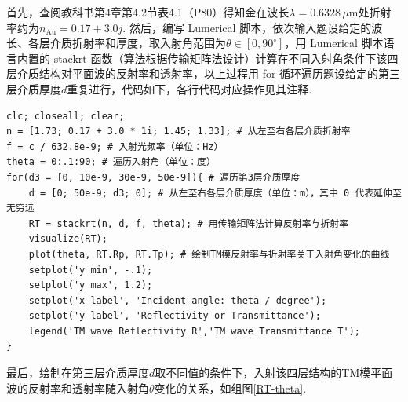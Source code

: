 \documentclass{assignment}
\begin{document}
\begin{sol}
    首先，查阅教科书第4章第4.2节表4.1（P80）\cite{chen2006foundations}得知金在波长$\lambda=0.6328\,\mu\mathrm{m}$处折射率约为$n_{\text{Au}}=0.17+3.0j$. 然后，编写 Lumerical 脚本，依次输入题设给定的波长、各层介质折射率和厚度，取入射角范围为$\theta\in[0,90^{\circ}]$，用 Lumerical 脚本语言内置的 stackrt 函数（算法根据传输矩阵法设计）计算在不同入射角条件下该四层介质结构对平面波的反射率和透射率，以上过程用 for 循环遍历题设给定的第三层介质厚度$d$重复进行，代码如下，各行代码对应操作见其注释.
    \begin{lstlisting}
clc; closeall; clear;
n = [1.73; 0.17 + 3.0 * 1i; 1.45; 1.33]; # 从左至右各层介质折射率
f = c / 632.8e-9; # 入射光频率（单位：Hz）
theta = 0:.1:90; # 遍历入射角（单位：度）
for(d3 = [0, 10e-9, 30e-9, 50e-9]){ # 遍历第3层介质厚度
    d = [0; 50e-9; d3; 0]; # 从左至右各层介质厚度（单位：m），其中 0 代表延伸至无穷远
    RT = stackrt(n, d, f, theta); # 用传输矩阵法计算反射率与折射率
    visualize(RT);
    plot(theta, RT.Rp, RT.Tp); # 绘制TM模反射率与折射率关于入射角变化的曲线
    setplot('y min', -.1);
    setplot('y max', 1.2);
    setplot('x label', 'Incident angle: theta / degree');
    setplot('y label', 'Reflectivity or Transmittance');
    legend('TM wave Reflectivity R','TM wave Transmittance T');
}
\end{lstlisting}
    最后，绘制在第三层介质厚度$d$取不同值的条件下，入射该四层结构的TM模平面波的反射率和透射率随入射角$\theta$变化的关系，如组图\ref{RT-theta}.
    \begin{figure}[H]
        \centering
\end{figure}
\end{sol}
\end{document}
